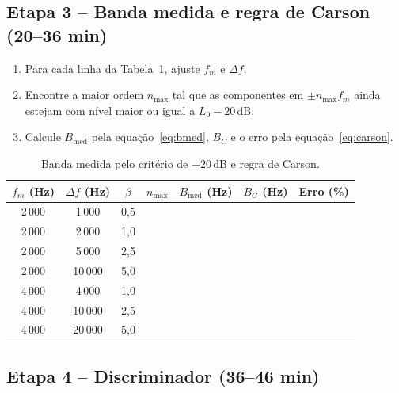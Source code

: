 \documentclass[11pt,a4paper]{article}
\begin{document}
\subsection*{Etapa 3 -- Banda medida e regra de Carson (20--36 min)}

\begin{instrucao}
  \begin{enumerate}[label=\arabic*.]
    \item Para cada linha da Tabela~\ref{tab:carson}, ajuste $f_m$ e $\Delta f$.
    \item Encontre a maior ordem $n_{\max}$ tal que as componentes em
          $\pm n_{\max} f_m$ ainda estejam com nível maior ou igual a $L_0 - 20$\,dB.
    \item Calcule $B_{\text{med}}$ pela equação~\eqref{eq:bmed}, $B_C$ e o erro
          pela equação~\eqref{eq:carson}.
  \end{enumerate}
\end{instrucao}

\begin{table}[H]
  \centering
  \begin{tabular}{c c c c c c c}
    \toprule
    $f_m$ (Hz)            & $\Delta f$ (Hz) & $\beta$   & $n_{\max}$ &
    $B_{\text{med}}$ (Hz) & $B_C$ (Hz)      & Erro (\%)                       \\
    \midrule
    2\,000                & 1\,000          & 0,5       &            &   &  & \\
    2\,000                & 2\,000          & 1,0       &            &   &  & \\
    2\,000                & 5\,000          & 2,5       &            &   &  & \\
    2\,000                & 10\,000         & 5,0       &            &   &  & \\
    4\,000                & 4\,000          & 1,0       &            &   &  & \\
    4\,000                & 10\,000         & 2,5       &            &   &  & \\
    4\,000                & 20\,000         & 5,0       &            &   &  & \\
    \bottomrule
  \end{tabular}
  \caption{Banda medida pelo critério de $-20$\,dB e regra de Carson.}
  \label{tab:carson}
\end{table}

\subsection*{Etapa 4 -- Discriminador (36--46 min)}
\end{document}
